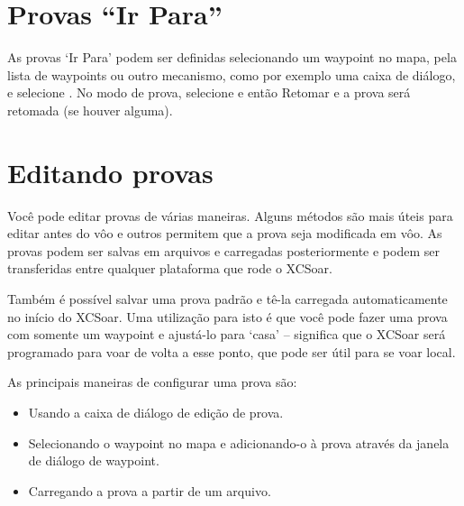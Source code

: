 \section{Provas “Ir Para”}

As provas ‘Ir Para’ podem ser definidas selecionando um waypoint no mapa, pela lista de waypoints ou outro mecanismo, como por exemplo uma caixa de diálogo, e selecione  . No modo de prova, selecione
 e então \blink{} {Retomar} e a prova será retomada (se houver alguma).
 

\section{Editando provas}

Você pode editar provas de várias maneiras. Alguns métodos são mais úteis para editar antes do vôo e outros permitem que a prova seja modificada em vôo.  As provas podem ser salvas em arquivos e carregadas posteriormente e podem ser transferidas entre qualquer plataforma que rode o XCSoar.

\tip Também é possível salvar uma prova padrão e tê-la carregada automaticamente no início do XCSoar.  Uma utilização para isto é que você pode fazer uma prova com somente um waypoint e ajustá-lo para ‘casa’ – significa que o XCSoar será programado para voar de volta a esse ponto, que pode ser útil para se voar local.

As principais maneiras de configurar uma prova são:
\begin{itemize}
\item Usando a caixa de diálogo de edição de prova.
\item Selecionando o waypoint no mapa e adicionando-o à prova através da janela de diálogo de waypoint.
\item Carregando a prova a partir de um arquivo.
\end{itemize}

%

